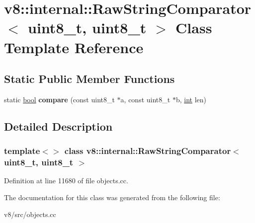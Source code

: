 \hypertarget{classv8_1_1internal_1_1RawStringComparator_3_01uint8__t_00_01uint8__t_01_4}{}\section{v8\+:\+:internal\+:\+:Raw\+String\+Comparator$<$ uint8\+\_\+t, uint8\+\_\+t $>$ Class Template Reference}
\label{classv8_1_1internal_1_1RawStringComparator_3_01uint8__t_00_01uint8__t_01_4}
\subsection*{Static Public Member Functions}
\begin{DoxyCompactItemize}
\item 
\mbox{\label{classv8_1_1internal_1_1RawStringComparator_3_01uint8__t_00_01uint8__t_01_4_a1229fa356a713a56bcf53b9a90d0a58c}} 
static \mbox{\hyperlink{classbool}{bool}} {\bfseries compare} (const uint8\+\_\+t $\ast$a, const uint8\+\_\+t $\ast$b, \mbox{\hyperlink{classint}{int}} len)
\end{DoxyCompactItemize}


\subsection{Detailed Description}
\subsubsection*{template$<$$>$\newline
class v8\+::internal\+::\+Raw\+String\+Comparator$<$ uint8\+\_\+t, uint8\+\_\+t $>$}



Definition at line 11680 of file objects.\+cc.



The documentation for this class was generated from the following file\+:\begin{DoxyCompactItemize}
\item 
v8/src/objects.\+cc\end{DoxyCompactItemize}

